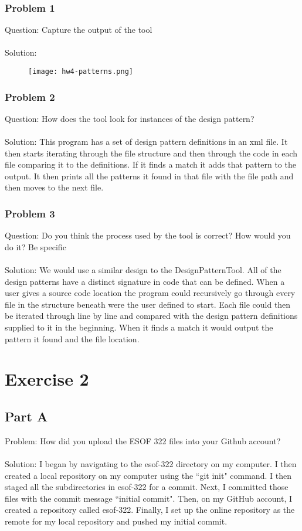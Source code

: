 \documentclass{article}
\begin{document}
\subsubsection*{Problem 1}
Question: Capture the output of the tool\\\\
Solution: 
\begin{figure}[h]
	\centering
	\texttt{[image: hw4-patterns.png]}
\end{figure}

\subsubsection*{Problem 2}
Question: How does the tool look for instances of the design pattern?\\\\
Solution: This program has a set of design pattern definitions in an xml file. It then starts iterating through the file structure and then through the code in each file comparing it to the definitions. If it finds a match it adds that pattern to the output. It then prints all the patterns it found in that file with the file path and then moves to the next file. 

\subsubsection*{Problem 3}
Question: Do you think the process used by the tool is correct?  How would you do it? Be specific\\\\
Solution: We would use a similar design to the DesignPatternTool. All of the design patterns have a distinct signature in code that can be defined. When a user gives a source code location the program could recursively go through every file in the structure beneath were the user defined to start. Each file could then be iterated through line by line and compared with the design pattern definitions supplied to it in the beginning. When it finds a match it would output the pattern it found and the file location. 

\newpage

\section*{Exercise 2}

\subsection*{Part A}
Problem: How did you upload the ESOF 322 files into your Github account? \\\\
Solution: I began by navigating to the esof-322 directory on my computer. I then created a local repository on my computer using the ``git init" command. 
I then staged all the subdirectories in esof-322 for a commit. Next, I committed those files with the commit message ``initial commit".
Then, on my GitHub account, I created a repository called esof-322.
Finally, I set up the online repository as the remote for my local repository and pushed my initial commit.
\end{document}
